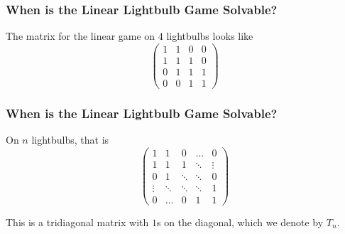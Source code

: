 \documentclass{beamer}
\newcommand{\off}{white}
\begin{document}
\begin{frame}
\frametitle{When is the Linear Lightbulb Game Solvable?}
The matrix for the linear game on $4$ lightbulbs looks like
\[
    \begin{pmatrix}
        1 & 1 & 0 & 0\\
        1 & 1 & 1 & 0\\
        0 & 1 & 1 & 1\\
        0 & 0 & 1 & 1
    \end{pmatrix}
\]

\begin{figure}[!h]
    \centering
\end{figure}
\end{frame}

\begin{frame}
\frametitle{When is the Linear Lightbulb Game Solvable?}
On $n$ lightbulbs, that is
\[
    \begin{pmatrix}
        1 & 1 & 0 & \dots & 0\\
        1 & 1 & 1 & \ddots & \vdots\\
        0 & 1 & \ddots & \ddots  & 0\\
        \vdots & \ddots & \ddots & \ddots & 1\\
        0 & \dots & 0 & 1 & 1
    \end{pmatrix}
\]

\begin{figure}[!h]
    \centering
\end{figure}
This is a tridiagonal matrix with $1$s on the diagonal, which we denote by $T_n$.
\end{frame}
\end{document}
